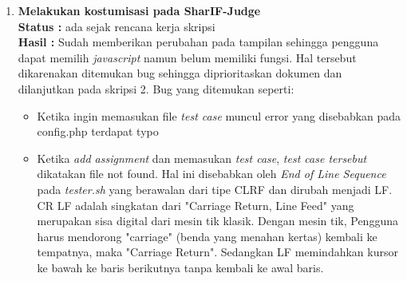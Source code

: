 \documentclass[a4paper,twoside]{article}
\begin{document}
\begin{enumerate}
\begin{itemize}
		    \end{itemize}

		\item \textbf{Melakukan kostumisasi pada SharIF-Judge}\\
		{\bf Status :} ada sejak rencana kerja skripsi \\
		{\bf Hasil :} Sudah memberikan perubahan pada tampilan sehingga pengguna dapat memilih \textit{javascript} namun belum memiliki fungsi. Hal tersebut dikarenakan ditemukan bug  sehingga diprioritaskan dokumen dan dilanjutkan pada skripsi 2. Bug yang ditemukan seperti: 
		    \begin{itemize}
		        \item Ketika ingin memasukan file \textit{test case} muncul error yang disebabkan pada config.php terdapat typo
		        \item Ketika \textit{add assignment} dan memasukan \textit{test case}, \textit{test case tersebut} dikatakan file not found. Hal ini disebabkan oleh \textit{End of Line Sequence} pada \textit{tester.sh} yang berawalan dari tipe CLRF dan dirubah menjadi LF. CR LF adalah singkatan dari "Carriage Return, Line Feed" yang merupakan sisa digital dari mesin tik klasik. Dengan mesin tik, Pengguna harus mendorong "carriage" (benda yang menahan kertas) kembali ke tempatnya, maka "Carriage Return". Sedangkan LF memindahkan kursor ke bawah ke baris berikutnya tanpa kembali ke awal baris.
		    \end{itemize}
	

\end{enumerate}
\end{document}
